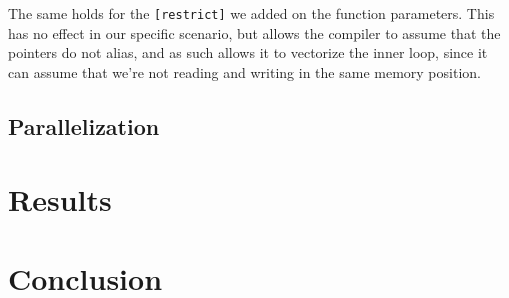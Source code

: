 \documentclass{article}
\begin{document}
The same holds for the \verb|[restrict]| we added on the function parameters. This has no effect in our specific scenario, but allows the compiler to assume that the pointers do not alias, and as such allows it to vectorize the inner loop, since it can assume that we're not reading and writing in the same memory position.

\subsection{Parallelization}

\section{Results}

\section{Conclusion}
\end{document}
